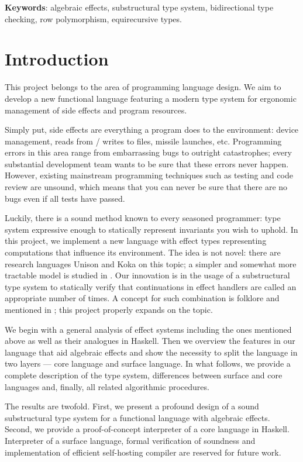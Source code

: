 \documentclass[a4paper,14pt]{extreport}
\begin{document}
\textbf{Keywords}: algebraic effects, substructural type system, bidirectional
type checking, row polymorphism, equirecursive types.

\chapter{Introduction}

This project belongs to the area of programming language design. We aim to
develop a new functional language featuring a modern type system for ergonomic
management of side effects and program resources.

Simply put, side effects are everything a program does to the environment:
device management, reads from / writes to files, missile launches, etc.
Programming errors in this area range from embarrassing bugs to outright
catastrophes; every substantial development team wants to be sure that these
errors never happen. However, existing mainstream programming techniques such as
testing and code review are unsound, which means that you can never be sure that
there are no bugs even if all tests have passed.

Luckily, there is a sound method known to every seasoned programmer: type system
expressive enough to statically represent invariants you wish to uphold. In this
project, we implement a new language with effect types representing computations
that influence its environment. The idea is not novel: there are research
languages Unison \cite{unison} and Koka \cite{koka} on this topic; a simpler and
somewhat more tractable model is studied in \cite{bauer}. Our innovation is in
the usage of a substructural type system to statically verify that continuations
in effect handlers are called an appropriate number of times. A concept for such
combination is folklore and mentioned in \cite{folklore}; this project properly
expands on the topic.

We begin with a general analysis of effect systems including the ones mentioned
above as well as their analogues in Haskell. Then we overview the features in
our language that aid algebraic effects and show the necessity to split the
language in two layers --- core language and surface language. In what follows,
we provide a complete description of the type system, differences between
surface and core languages and, finally, all related algorithmic procedures.

The results are twofold. First, we present a profound design of a sound
substructural type system for a functional language with algebraic effects.
Second, we provide a proof-of-concept interpreter of a core language in
Haskell. Interpreter of a surface language, formal verification of soundness and
implementation of efficient self-hosting compiler are reserved for future work.
\end{document}
